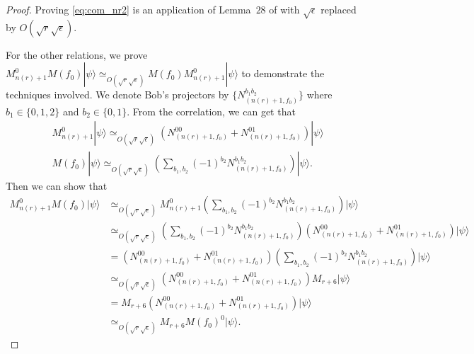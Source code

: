\documentclass[11pt,letterpaper]{article}
\newcommand{\ket}[1]{|#1\rangle}
\newcommand{\1}{\mathbb{1}}
\newcommand{\nr}{n(r)}
\newcommand{\se}{\sqrt{\epsilon}}
\newcommand{\sr}{\sqrt{r}}
\newcommand{\appd}[1]{\simeq_{#1}}
\theoremstyle{definition}
\begin{document}
\begin{proof}
	Proving \cref{eq:com_nr2} is an application of Lemma~$28$ of \cite{coladan2017verifier} with $\se$ replaced by $O(\sr \se)$.
	
	For the other relations, we prove $M_{\nr+1}^0M(f_0) \ket{\psi} \appd{O(\sr \se)} M(f_0)M_{\nr+1}^0 \ket{\psi}$ to demonstrate 
	the techniques involved. We denote Bob's projectors by $\{ N_{(\nr+1, f_0)}^{b_1 b_2} \}$ where $b_1 \in \{0, 1, 2\}$ and
	$b_2 \in \{0,1\}$. From the correlation, we can get that 
	\begin{align*}
		&M_{\nr+1}^0 \ket{\psi} \appd{O(\sr \se)} 
		(N_{(\nr+1, f_0)}^{00} + N_{(\nr+1, f_0)}^{01}) \ket{\psi} \\
		&M(f_0) \ket{\psi} \appd{O(\sr \se)} 
		(\sum_{b_1, b_2} (-1)^{b_2} N_{(\nr+1, f_0)}^{b_1b_2})\ket{\psi}.
	\end{align*}
	Then we can show that
	\begin{align*}
		M_{\nr+1}^0 M(f_0) \ket{\psi} &\appd{O(\sr \se)} M_{\nr+1}^0 (\sum_{b_1, b_2} (-1)^{b_2}N_{(\nr+1,f_0)}^{b_1b_2})\ket{\psi}\\
		&\appd{O(\sr\se)}(\sum_{b_1, b_2} (-1)^{b_2}N_{(\nr+1, f_0)}^{b_1b_2}) 
		(N_{(\nr+1, f_0)}^{00} + N_{(\nr+1, f_0)}^{01}) \ket{\psi} \\
		&= (N_{(\nr+1, f_0)}^{00} + N_{(\nr+1, f_0)}^{01}) (\sum_{b_1, b_2} (-1)^{b_2}N_{(\nr+1, f_0)}^{b_1b_2})  \ket{\psi} \\
		& \appd{O(\sr \se)} (N_{(\nr+1, f_0)}^{00} + N_{(\nr+1, f_0)}^{01}) M_{r+6} \ket{\psi} \\
		&= M_{r+6}  (N_{(\nr+1, f_0)}^{00} + N_{(\nr+1, f_0)}^{01}) \ket{\psi} \\
		& \appd{O(\sr\se)} M_{r+6}M(f_0)^0 \ket{\psi}.
	\end{align*}
\end{proof}
\end{document}
